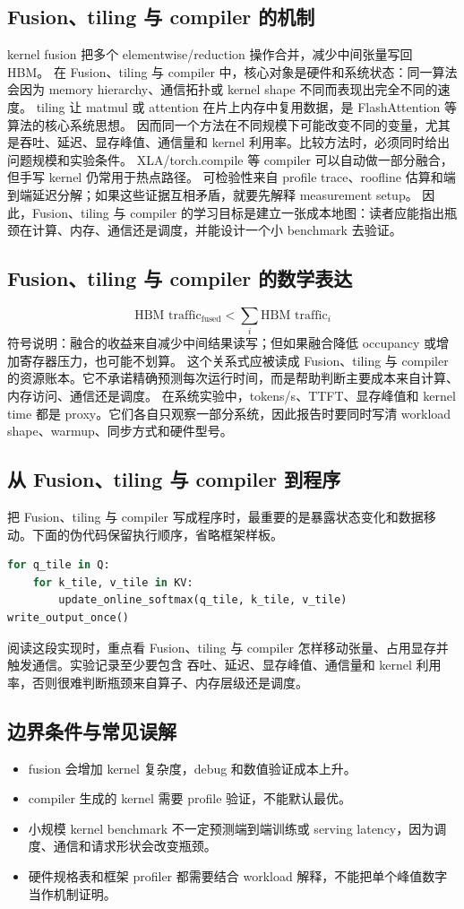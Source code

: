 \documentclass[a4paper]{article}
\begin{document}
\subsection{Fusion、tiling 与 compiler 的机制}
kernel fusion 把多个 elementwise/reduction 操作合并，减少中间张量写回 HBM。 在 Fusion、tiling 与 compiler 中，核心对象是硬件和系统状态：同一算法会因为 memory hierarchy、通信拓扑或 kernel shape 不同而表现出完全不同的速度。
tiling 让 matmul 或 attention 在片上内存中复用数据，是 FlashAttention 等算法的核心系统思想。 因而同一个方法在不同规模下可能改变不同的变量，尤其是吞吐、延迟、显存峰值、通信量和 kernel 利用率。比较方法时，必须同时给出问题规模和实验条件。
XLA/torch.compile 等 compiler 可以自动做一部分融合，但手写 kernel 仍常用于热点路径。 可检验性来自 profile trace、roofline 估算和端到端延迟分解；如果这些证据互相矛盾，就要先解释 measurement setup。
因此，Fusion、tiling 与 compiler 的学习目标是建立一张成本地图：读者应能指出瓶颈在计算、内存、通信还是调度，并能设计一个小 benchmark 去验证。
\subsection{Fusion、tiling 与 compiler 的数学表达}
\[\text{HBM traffic}_{\text{fused}} < \sum_i \text{HBM traffic}_{i}\]
符号说明：融合的收益来自减少中间结果读写；但如果融合降低 occupancy 或增加寄存器压力，也可能不划算。
这个关系式应被读成 Fusion、tiling 与 compiler 的资源账本。它不承诺精确预测每次运行时间，而是帮助判断主要成本来自计算、内存访问、通信还是调度。
在系统实验中，tokens/s、TTFT、显存峰值和 kernel time 都是 proxy。它们各自只观察一部分系统，因此报告时要同时写清 workload shape、warmup、同步方式和硬件型号。
\subsection{从 Fusion、tiling 与 compiler 到程序}
把 Fusion、tiling 与 compiler 写成程序时，最重要的是暴露状态变化和数据移动。下面的伪代码保留执行顺序，省略框架样板。
\begin{lstlisting}[language=Python]
for q_tile in Q:
    for k_tile, v_tile in KV:
        update_online_softmax(q_tile, k_tile, v_tile)
write_output_once()
\end{lstlisting}
阅读这段实现时，重点看 Fusion、tiling 与 compiler 怎样移动张量、占用显存并触发通信。实验记录至少要包含 吞吐、延迟、显存峰值、通信量和 kernel 利用率，否则很难判断瓶颈来自算子、内存层级还是调度。
\subsection{边界条件与常见误解}
\begin{itemize}
\item fusion 会增加 kernel 复杂度，debug 和数值验证成本上升。
\item compiler 生成的 kernel 需要 profile 验证，不能默认最优。
\item 小规模 kernel benchmark 不一定预测端到端训练或 serving latency，因为调度、通信和请求形状会改变瓶颈。
\item 硬件规格表和框架 profiler 都需要结合 workload 解释，不能把单个峰值数字当作机制证明。
\end{itemize}
\end{document}
